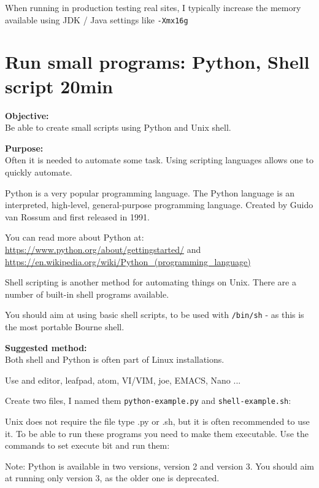 \documentclass[a4paper,11pt,notitlepage]{report}
\begin{document}
When running in production testing real sites, I typically increase the memory available using JDK / Java settings like \verb+-Xmx16g+

\chapter{Run small programs: Python, Shell script 20min}
\label{ex:small-python}

{\bf Objective:}\\
Be able to create small scripts using Python and Unix shell.

{\bf Purpose:}\\
Often it is needed to automate some task. Using scripting languages allows one to quickly automate.

Python is a very popular programming language. The Python language
is an interpreted, high-level, general-purpose programming language. Created by Guido van Rossum and first released in 1991.


You can read more about Python at:\\
\url{https://www.python.org/about/gettingstarted/} and \\
\url{https://en.wikipedia.org/wiki/Python_(programming_language)}

Shell scripting is another method for automating things on Unix. There are a number of built-in shell programs available.

You should aim at using basic shell scripts, to be used with \verb+/bin/sh+ - as this is the most portable Bourne shell.



{\bf Suggested method:}\\
Both shell and Python is often part of Linux installations.

Use and editor, leafpad, atom, VI/VIM, joe, EMACS, Nano ...

Create two files, I named them \verb+python-example.py+ and \verb+shell-example.sh+:



Unix does not require the file type .py or .sh, but it is often recommended to use it. To be able to run these programs you need to make them executable. Use the commands to set execute bit and run them:



Note: Python is available in two versions, version 2 and version 3. You should aim at running only version 3, as the older one is deprecated.
\end{document}
